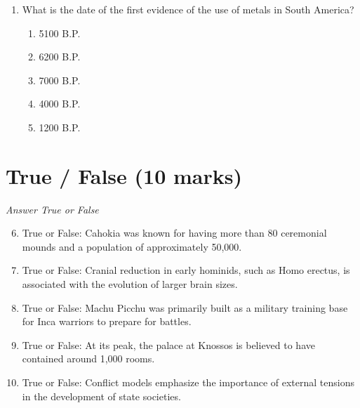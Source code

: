 \documentclass[12pt]{article}
\begin{document}
\begin{enumerate}[label=\arabic*.]
\begin{enumerate}[label=(\alph*)]
    \item proximity to other Paleoindian settlements.
    \item presence of a large lake for fishing and transportation.
    \item nearby location of migratory routes of large mammals such as bison.
    \item proximity to a local source of chert for quarrying and making stone tools.
\end{enumerate}
\item What is the date of the first evidence of the use of metals in South America?
\begin{enumerate}[label=(\alph*)]
    \item 5100 B.P.
    \item 6200 B.P.
    \item 7000 B.P.
    \item 4000 B.P.
    \item 1200 B.P.
\end{enumerate}
\end{enumerate}

\section*{True / False (10 marks)}
\textit{Answer True or False}
\begin{enumerate}[label=\arabic*.]
\setcounter{enumi}{5}
\item True or False: Cahokia was known for having more than 80 ceremonial mounds and a population of approximately 50,000.
\item True or False: Cranial reduction in early hominids, such as Homo erectus, is associated with the evolution of larger brain sizes.
\item True or False: Machu Picchu was primarily built as a military training base for Inca warriors to prepare for battles.
\item True or False: At its peak, the palace at Knossos is believed to have contained around 1,000 rooms.
\item True or False: Conflict models emphasize the importance of external tensions in the development of state societies.
\end{enumerate}
\end{document}
